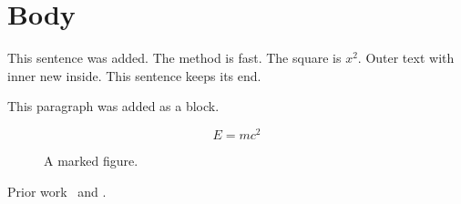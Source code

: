 \section{Body}

This sentence was added.
The method is fast.
The square is $x^2$.
Outer text with inner new inside.
This sentence keeps its end.

This paragraph was added as a block.

\begin{equation}
E = mc^2
\end{equation}

\begin{figure}[h]
  \centering
  \caption{A marked figure.}
\end{figure}

Prior work~\cite{doe2020added} and \cite{roe2021missing}.
